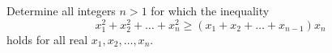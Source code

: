 Determine all integers $ n>1$ for which the inequality \[ x_1^2+x_2^2+\ldots+x_n^2\ge(x_1+x_2+\ldots+x_{n-1})x_n\] holds for all real $ x_1,x_2,\ldots,x_n$.